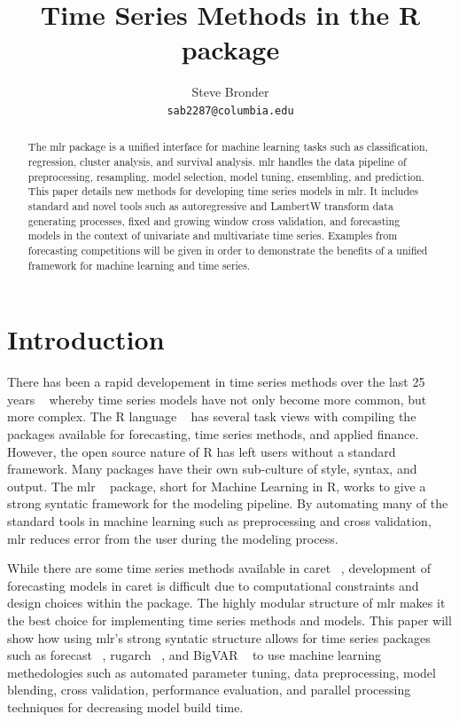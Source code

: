 \documentclass{article}\usepackage[]{graphicx}\usepackage[]{color}
\title{Time Series Methods in the R package \pkg{mlr}}
\author{
  Steve Bronder \\
  \texttt{sab2287@columbia.edu} \\
}
\theoremstyle{definition}
\let\proglang=\textsf
\newcommand{\pkg}[1]{{\fontseries{b}\selectfont #1}}
\begin{document}

\maketitle

\begin{abstract}
The \pkg{mlr} package is a unified interface for machine learning tasks such as classification, regression, cluster analysis, and survival analysis. \pkg{mlr} handles the data pipeline of preprocessing, resampling, model selection, model tuning, ensembling, and prediction. This paper details new methods for developing time series  models in \pkg{mlr}. It includes standard and novel tools such as autoregressive and LambertW transform data generating processes, fixed and growing window cross validation, and forecasting models in the context of univariate and multivariate time series. Examples from forecasting competitions will be given in order to demonstrate the benefits of a unified framework for machine learning and time series.
  \end{abstract}

\section{Introduction}
There has been a rapid developement in time series methods over the last 25 years ~\cite{Hyndman25} whereby time series models have not only become more common, but more complex. The \proglang{R} language ~\cite{Rbase} has several task views with compiling the packages available for forecasting, time series methods, and applied finance. However, the open source nature of R has left users without a standard framework. Many packages have their own sub-culture of style, syntax, and output. The \pkg{mlr} ~\cite{mlr} package, short for Machine Learning in R, works to give a strong syntatic framework for the modeling pipeline. By automating many of the standard tools in machine learning such as preprocessing and cross validation, \pkg{mlr} reduces error from the user during the modeling process. 

While there are some time series methods available in \pkg{caret} ~\cite{caret}, development of forecasting models in \pkg{caret} is difficult due to computational constraints and design choices within the package. The highly modular structure of \pkg{mlr} makes it the best choice for implementing time series methods and models. This paper will show how using \pkg{mlr}'s strong syntatic structure allows for time series packages such as \pkg{forecast} ~\cite{HyndForecast}, \pkg{rugarch} ~\cite{rugarch}, and \pkg{BigVAR} ~\cite{BigVAR} to use machine learning methedologies such as automated parameter tuning, data preprocessing, model blending, cross validation, performance evaluation, and parallel processing techniques for decreasing model build time.
\end{document}
